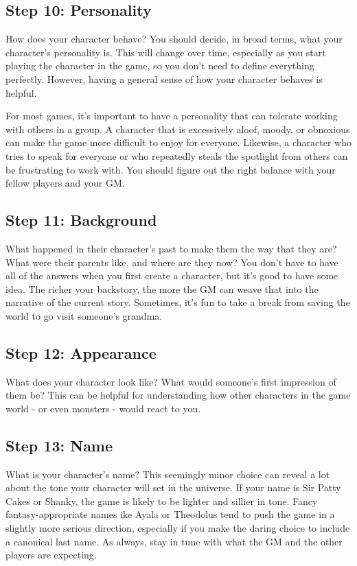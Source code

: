     \subsection{Step 10: Personality}

        How does your character behave?
        You should decide, in broad terms, what your character's personality is.
        This will change over time, especially as you start playing the character in the game, so you don't need to define everything perfectly.
        However, having a general sense of how your character behaves is helpful.

        For most games, it's important to have a personality that can tolerate working with others in a group.
        A character that is excessively aloof, moody, or obnoxious can make the game more difficult to enjoy for everyone.
        Likewise, a character who tries to speak for everyone or who repeatedly steals the spotlight from others can be frustrating to work with.
        You should figure out the right balance with your fellow players and your GM.\@

    \subsection{Step 11: Background}
        What happened in their character's past to make them the way that they are?
        What were their parents like, and where are they now?
        You don't have to have all of the answers when you first create a character, but it's good to have some idea.
        The richer your backstory, the more the GM can weave that into the narrative of the current story.
        Sometimes, it's fun to take a break from saving the world to go visit someone's grandma.

    \subsection{Step 12: Appearance}
        What does your character look like?
        What would someone's first impression of them be?
        This can be helpful for understanding how other characters in the game world - or even monsters - would react to you.

    \subsection{Step 13: Name}
        What is your character's name?
        This seemingly minor choice can reveal a lot about the tone your character will set in the universe.
        If your name is Sir Patty Cakes or Shanky, the game is likely to be lighter and sillier in tone.
        Fancy fantasy-appropriate names ike Ayala or Theodolus tend to push the game in a slightly more serious direction, especially if you make the daring choice to include a canonical last name.
        As always, stay in tune with what the GM and the other players are expecting.


